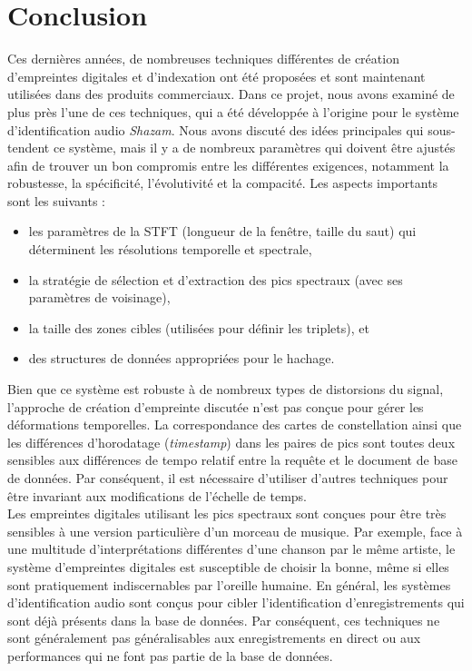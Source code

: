 \documentclass[11pt, report, french]{scrreprt}
\begin{document}
\chapter{Conclusion}
Ces dernières années, de nombreuses techniques différentes de création d'empreintes digitales et d'indexation ont été proposées et sont maintenant utilisées dans des produits commerciaux. Dans ce projet, nous avons examiné de plus près l'une de ces techniques, qui a été développée à l'origine pour le système d'identification audio \textit{Shazam}. Nous avons discuté des idées principales qui sous-tendent ce système, mais il y a de nombreux paramètres qui doivent être ajustés afin de trouver un bon compromis entre les différentes exigences, notamment la robustesse, la spécificité, l'évolutivité et la compacité. Les aspects importants sont les suivants :\\

 \begin{itemize}
	\item les paramètres de la STFT (longueur de la fenêtre, taille du saut) qui déterminent les résolutions temporelle et spectrale,
	\item la stratégie de sélection et d'extraction des pics spectraux (avec ses paramètres de voisinage),
	\item la taille des zones cibles (utilisées pour définir les triplets), et
	\item des structures de données appropriées pour le hachage.
\end{itemize}

\vspace{0.5cm}
Bien que ce système est robuste à de nombreux types de distorsions du signal, l'approche de création d'empreinte discutée n'est pas conçue pour gérer les déformations temporelles. La correspondance des cartes de constellation ainsi que les différences d'horodatage (\textit{timestamp}) dans les paires de pics sont toutes deux sensibles aux différences de tempo relatif entre la requête et le document de base de données. Par conséquent, il est nécessaire d'utiliser d'autres techniques pour être invariant aux modifications de l'échelle de temps.\\

Les empreintes digitales utilisant les pics spectraux sont conçues pour être très sensibles à une version particulière d'un morceau de musique. Par exemple, face à une multitude d'interprétations différentes d'une chanson par le même artiste, le système d'empreintes digitales est susceptible de choisir la bonne, même si elles sont pratiquement indiscernables par l'oreille humaine. En général, les systèmes d'identification audio sont conçus pour cibler l'identification d'enregistrements qui sont déjà présents dans la base de données. Par conséquent, ces techniques ne sont généralement pas généralisables aux enregistrements en direct ou aux performances qui ne font pas partie de la base de données.
\end{document}
